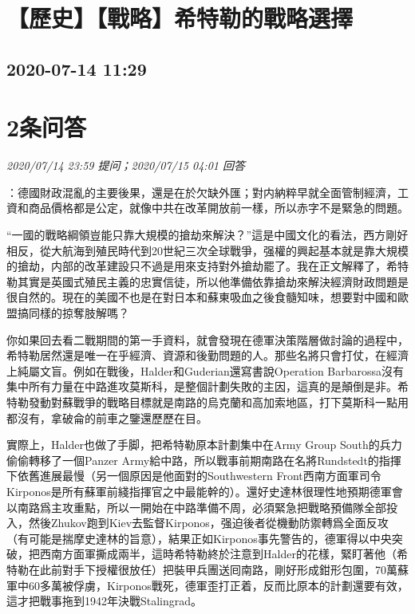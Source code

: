 \documentclass[twocolumn]{ctexart}
\begin{document}
\section{【歷史】【戰略】希特勒的戰略選擇}
\subsection{2020-07-14 11:29}


\section{2条问答}

\textit{\hfill\noindent\small 2020/07/14 23:59 提问；2020/07/15 04:01 回答}

：德國財政混亂的主要後果，還是在於欠缺外匯；對内納粹早就全面管制經濟，工資和商品價格都是公定，就像中共在改革開放前一樣，所以赤字不是緊急的問題。

“一國的戰略綱領豈能只靠大規模的搶劫來解決？”這是中國文化的看法，西方剛好相反，從大航海到殖民時代到20世紀三次全球戰爭，强權的興起基本就是靠大規模的搶劫，内部的改革建設只不過是用來支持對外搶劫罷了。我在正文解釋了，希特勒其實是英國式殖民主義的忠實信徒，所以他準備依靠搶劫來解決經濟財政問題是很自然的。現在的美國不也是在對日本和蘇東吸血之後食髓知味，想要對中國和歐盟搞同樣的掠奪肢解嗎？

你如果回去看二戰期間的第一手資料，就會發現在德軍決策階層做討論的過程中，希特勒居然還是唯一在乎經濟、資源和後勤問題的人。那些名將只會打仗，在經濟上純屬文盲。例如在戰後，Halder和Guderian還寫書說Operation Barbarossa沒有集中所有力量在中路進攻莫斯科，是整個計劃失敗的主因，這真的是顛倒是非。希特勒發動對蘇戰爭的戰略目標就是南路的烏克蘭和高加索地區，打下莫斯科一點用都沒有，拿破侖的前車之鑒還歷歷在目。

實際上，Halder也做了手脚，把希特勒原本計劃集中在Army Group South的兵力偷偷轉移了一個Panzer Army給中路，所以戰事前期南路在名將Rundstedt的指揮下依舊進展最慢（另一個原因是他面對的Southwestern Front西南方面軍司令Kirponos是所有蘇軍前綫指揮官之中最能幹的）。還好史達林很理性地預期德軍會以南路爲主攻重點，所以一開始在中路準備不周，必須緊急把戰略預備隊全部投入，然後Zhukov跑到Kiev去監督Kirponos，强迫後者從機動防禦轉爲全面反攻（有可能是揣摩史達林的旨意），結果正如Kirponos事先警告的，德軍得以中央突破，把西南方面軍撕成兩半，這時希特勒終於注意到Halder的花樣，緊盯著他（希特勒在此前對手下授權很放任）把裝甲兵團送囘南路，剛好形成鉗形包圍，70萬蘇軍中60多萬被俘虜，Kirponos戰死，德軍歪打正着，反而比原本的計劃還要有效，這才把戰事拖到1942年決戰Stalingrad。
\end{document}

